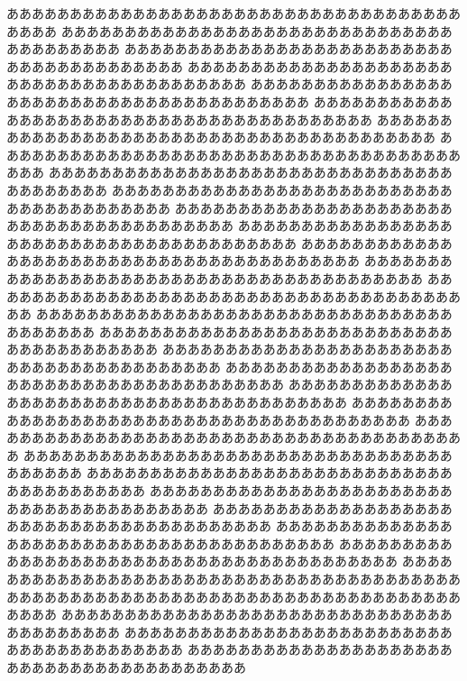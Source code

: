 \documentclass[twocolumn]{bxjsarticle}
\begin{document}
ああああああああああああああああああああああああああああああああああああああああ
ああああああああああああああああああああああああああああああああああああああああ
ああああああああああああああああああああああああああああああああああああああああ
ああああああああああああああああああああああああああああああああああああああああ
ああああああああああああああああああああああああああああああああああああああああ
ああああああああああああああああああああああああああああああああああああああああ
ああああああああああああああああああああああああああああああああああああああああ
ああああああああああああああああああああああああああああああああああああああああ
ああああああああああああああああああああああああああああああああああああああああ
ああああああああああああああああああああああああああああああああああああああああ
ああああああああああああああああああああああああああああああああああああああああ
ああああああああああああああああああああああああああああああああああああああああ
ああああああああああああああああああああああああああああああああああああああああ
ああああああああああああああああああああああああああああああああああああああああ
ああああああああああああああああああああああああああああああああああああああああ
ああああああああああああああああああああああああああああああああああああああああ
ああああああああああああああああああああああああああああああああああああああああ
ああああああああああああああああああああああああああああああああああああああああ
ああああああああああああああああああああああああああああああああああああああああ
ああああああああああああああああああああああああああああああああああああああああ
ああああああああああああああああああああああああああああああああああああああああ
ああああああああああああああああああああああああああああああああああああああああ
ああああああああああああああああああああああああああああああああああああああああ
ああああああああああああああああああああああああああああああああああああああああ
ああああああああああああああああああああああああああああああああああああああああ
ああああああああああああああああああああああああああああああああああああああああ
ああああああああああああああああああああああああああああああああああああああああ
ああああああああああああああああああああああああああああああああああああああああ
ああああああああああああああああああああああああああああああああああああああああ
ああああああああああああああああああああああああああああああああああああああああ
ああああああああああああああああああああああああああああああああああああああああ
ああああああああああああああああああああああああああああああああああああああああ
ああああああああああああああああああああああああああああああああああああああああ
\end{document}
